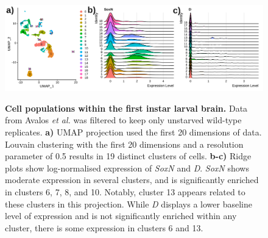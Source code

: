 \documentclass[withindex,glossary]{cam-thesis}
\begin{document}
\setcounter{figure}{12-1}
\begin{figure}[bhtp]
\centering
\includegraphics[width=\textwidth]{figs/Fig12 larval UMAP and ridges.png}
\label{fig12}
\caption{\textbf{Cell populations within the first instar larval brain.} Data from Avalos \emph{et al.} was filtered to keep only unstarved wild-type replicates. \textbf{a)} UMAP projection used the first 20 dimensions of data. Louvain clustering with the first 20 dimensions and a resolution parameter of 0.5 results in 19 distinct clusters of cells. \textbf{b-c)} Ridge plots show log-normalised expression of \emph{SoxN} and \emph{D}. \emph{SoxN} shows moderate expression in several clusters, and is significantly enriched in clusters 6, 7, 8, and 10. Notably, cluster 13 appears related to these clusters in this projection. While \emph{D} displays a lower baseline level of expression and is not significantly enriched within any cluster, there is some expression in clusters 6 and 13.}
\end{figure}
\end{document}
